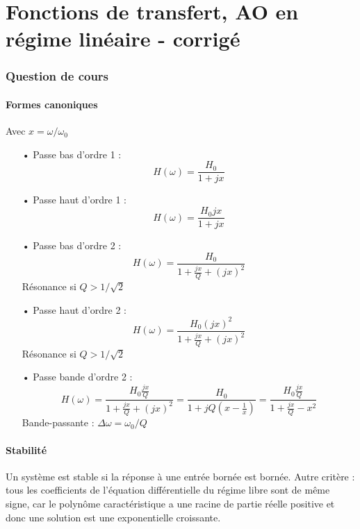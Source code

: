 \documentclass{report}
\begin{document}
\chapter{Fonctions de transfert, AO en régime linéaire - corrigé}

\newpage

\subsection*{Question de cours}

\subsubsection*{Formes canoniques}
Avec $x=\omega/\omega_0$ 
\begin{itemize}
	\item[•] Passe bas d'ordre 1 :
	\begin{equation}
		H(\omega)=\frac{H_0}{1+jx}
	\end{equation}
	\item[•] Passe haut d'ordre 1 :
	\begin{equation}
		H(\omega)=\frac{H_0jx}{1+jx}
	\end{equation}
	\item[•] Passe bas d'ordre 2 :
	\begin{equation}
		H(\omega)=\frac{H_0}{1+\frac{jx}{Q}+(jx)^2}
	\end{equation}
	Résonance si $Q>1/\sqrt{2}$
	\item[•] Passe haut d'ordre 2 :
	\begin{equation}
		H(\omega)=\frac{H_0(jx)^2}{1+\frac{jx}{Q}+(jx)^2}
	\end{equation}
	Résonance si $Q>1/\sqrt{2}$
	\item[•] Passe bande d'ordre 2 :
	\begin{equation}
		H(\omega)=\frac{H_0\frac{jx}{Q}}{1+\frac{jx}{Q}+(jx)^2}=\frac{H_0}{1+jQ\left(x - \frac{1}{x} \right) }=\frac{H_0\frac{jx}{Q}}{1+\frac{jx}{Q}-x^2}
	\end{equation}
	Bande-passante : $\Delta\omega=\omega_0/Q$
\end{itemize}

\subsubsection*{Stabilité}
Un système est stable si la réponse à une entrée bornée est bornée. Autre critère : tous les coefficients de l'équation différentielle du régime libre sont de même signe, car le polynôme caractéristique a une racine de partie réelle positive et donc une solution est une exponentielle croissante.
\end{document}

